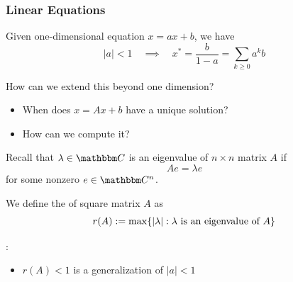 \begin{frame}
     \frametitle{Linear Equations}   

    Given one-dimensional equation $x = ax + b$, we have 
    \begin{equation*}
        |a| < 1 \quad \implies \quad
        x^* = \frac{b}{1-a} = \sum_{k \geq 0} a^k b
    \end{equation*}

    \vspace{1em}
    \vspace{1em}
    How can we extend this beyond one dimension?

    \vspace{1em}
    \begin{itemize}
        \item When does $x = Ax + b$ have a unique solution?
        \vspace{1em}
        \item How can we compute it?
    \end{itemize}

\end{frame}


\begin{frame}

    Recall that $\lambda \in \CC$ is an eigenvalue of $n \times n$ matrix $A$ if
    \begin{equation*}
        A e = \lambda e
    \end{equation*}
    for some nonzero $e \in \CC^n$.

    \vspace{1em}
    We define the  of square matrix $A$ as
    \begin{equation*}
        r(A) := \max\{ |\lambda| : \lambda \text{ is an eigenvalue of } A \}    
    \end{equation*}

    \vspace{1em}
    \vspace{1em}
    : 
    \begin{itemize}
        \item $r(A)<1$ is a generalization of $|a|<1$
    \end{itemize}



    
\end{frame}

